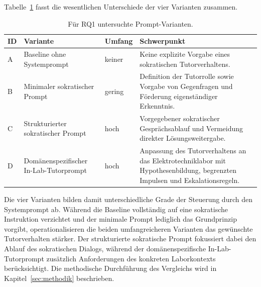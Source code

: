 Tabelle~\ref{tab:prompt_varianten} fasst die wesentlichen Unterschiede der vier Varianten zusammen.
 
\begin{table}[htbp]
    \centering
    \caption{Für RQ1 untersuchte Prompt-Varianten.}
    \label{tab:prompt_varianten}
 
    \renewcommand{\arraystretch}{1.25}
 
    \begin{tabularx}{\linewidth}{
        @{}
>{\centering\arraybackslash}p{0.8cm}
>{\raggedright\arraybackslash}p{3.7cm}
>{\centering\arraybackslash}p{1.8cm}
>{\raggedright\arraybackslash}X
        @{}
    }
        \toprule
        \textbf{ID} &
        \textbf{Variante} &
        \textbf{Umfang} &
        \textbf{Schwerpunkt} \\
        \midrule
 
        A &
        Baseline ohne Systemprompt &
        keiner &
        Keine explizite Vorgabe eines sokratischen Tutorverhaltens. \\[0.3em]
 
        B &
        Minimaler sokratischer Prompt &
        gering &
        Definition der Tutorrolle sowie Vorgabe von Gegenfragen und Förderung eigenständiger Erkenntnis. \\[0.3em]
 
        C &
        Strukturierter sokratischer Prompt &
        hoch &
        Vorgegebener sokratischer Gesprächsablauf und Vermeidung direkter Lösungsweitergabe. \\[0.3em]
 
        D &
        Domänenspezifischer In-Lab-Tutorprompt &
        hoch &
        Anpassung des Tutorverhaltens an das Elektrotechniklabor mit Hypothesenbildung, begrenzten Impulsen und Eskalationsregeln. \\
 
        \bottomrule
    \end{tabularx}
\end{table}
 
Die vier Varianten bilden damit unterschiedliche Grade der Steuerung durch den Systemprompt ab. Während die Baseline vollständig auf eine sokratische Instruktion verzichtet und der minimale Prompt lediglich das Grundprinzip vorgibt, operationalisieren die beiden umfangreicheren Varianten das gewünschte Tutorverhalten stärker. Der strukturierte sokratische Prompt fokussiert dabei den Ablauf des sokratischen Dialogs, während der domänenspezifische In-Lab-Tutorprompt zusätzlich Anforderungen des konkreten Laborkontexts berücksichtigt. Die methodische Durchführung des Vergleichs wird in Kapitel~\ref{sec:methodik} beschrieben.
 
